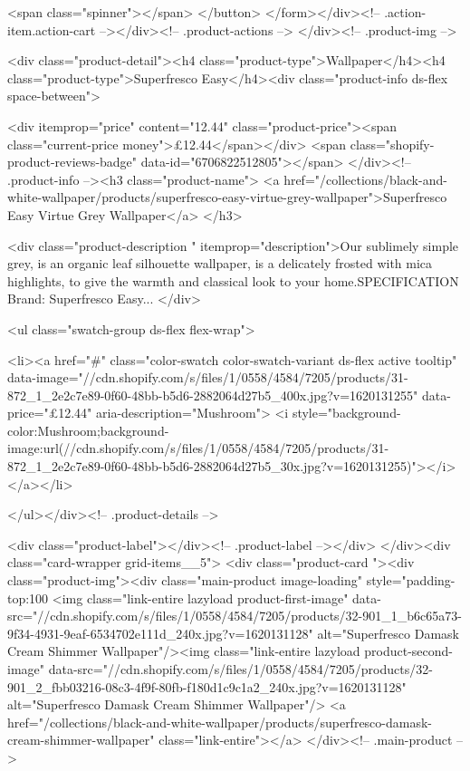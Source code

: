 {{{{{{{              <span class="spinner"></span>
            </button>
          </form></div><!-- .action-item.action-cart --></div><!-- .product-actions -->
</div><!-- .product-img -->

<div class="product-detail"><h4 class="product-type">Wallpaper</h4><h4 class="product-type">Superfresco Easy</h4><div class="product-info ds-flex space-between">
    
<div itemprop="price" content="12.44" class="product-price"><span class="current-price money">£12.44</span></div>
    <span class="shopify-product-reviews-badge" data-id="6706822512805"></span>
  </div><!-- .product-info --><h3 class="product-name">
      <a href="/collections/black-and-white-wallpaper/products/superfresco-easy-virtue-grey-wallpaper">Superfresco Easy Virtue Grey Wallpaper</a>
    </h3>
    
<div class="product-description " itemprop="description">Our sublimely simple grey, is an organic leaf silhouette wallpaper, is a delicately frosted with mica highlights, to give the warmth and classical look to your home.SPECIFICATION Brand: Superfresco Easy...
</div>



<ul class="swatch-group ds-flex flex-wrap">
        
<li><a href="#" class="color-swatch color-swatch-variant ds-flex active tooltip" data-image="//cdn.shopify.com/s/files/1/0558/4584/7205/products/31-872_1_2e2c7e89-0f60-48bb-b5d6-2882064d27b5_400x.jpg?v=1620131255" data-price="£12.44" aria-description="Mushroom">
              <i style="background-color:Mushroom;background-image:url(//cdn.shopify.com/s/files/1/0558/4584/7205/products/31-872_1_2e2c7e89-0f60-48bb-b5d6-2882064d27b5_30x.jpg?v=1620131255)"></i>
            </a></li>

      </ul></div><!-- .product-details -->

<div class="product-label"></div><!-- .product-label --></div>
          </div><div class="card-wrapper grid-items__5">
            <div class="product-card "><div class="product-img"><div class="main-product image-loading" style="padding-top:100%
      <img class="link-entire lazyload product-first-image" data-src="//cdn.shopify.com/s/files/1/0558/4584/7205/products/32-901_1_b6c65a73-9f34-4931-9eaf-6534702e111d_240x.jpg?v=1620131128" alt="Superfresco Damask Cream Shimmer Wallpaper"/><img class="link-entire lazyload product-second-image" data-src="//cdn.shopify.com/s/files/1/0558/4584/7205/products/32-901_2_fbb03216-08c3-4f9f-80fb-f180d1c9c1a2_240x.jpg?v=1620131128" alt="Superfresco Damask Cream Shimmer Wallpaper"/>
      <a href="/collections/black-and-white-wallpaper/products/superfresco-damask-cream-shimmer-wallpaper" class="link-entire"></a>
    </div><!-- .main-product -->
  
}}}}}}}
